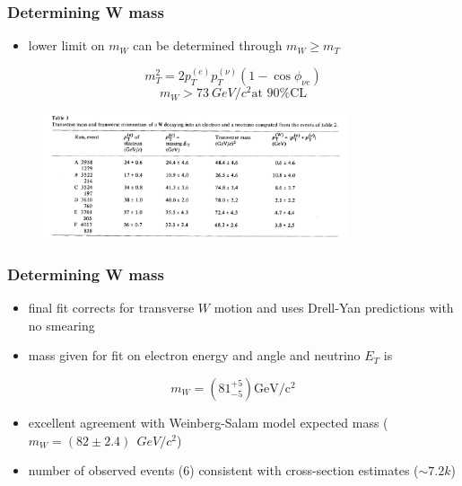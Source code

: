 \documentclass[xcolor=table]{beamer}
\begin{document}

\begin{frame}
\frametitle{Determining W mass}
\fontsize{10pt}{12}\selectfont

\begin{itemize}
\item lower limit on $m_W$ can be determined through $m_W\geq m_T$
\end{itemize}
\begin{equation*}
m_T^2=2p_T^{(e)}p_T^{(\nu)}(1-\cos\phi_{\nu e})
\end{equation*}
\begin{equation*}
m_W > \SI{73}{GeV/c^2} \text{at 90\% CL}
\end{equation*}
\begin{figure}[h]
\centering
\includegraphics[width=0.8\textwidth]{images/transverse-mass.png}
\end{figure}


\end{frame}



\begin{frame}
\frametitle{Determining W mass}
\fontsize{10pt}{12}\selectfont

\begin{itemize}
\item final fit corrects for transverse $W$ motion and uses Drell-Yan predictions with no smearing
\item mass given for fit on electron energy and angle and neutrino $E_T$ is
\end{itemize}

\begin{equation*}
m_W=\left(81^{+5}_{-5}\right)\text{GeV}/\text{c}^2
\end{equation*}

\begin{itemize}
\item excellent agreement with Weinberg-Salam model expected mass ($m_{W}=(82\pm 2.4)~\SI{}{GeV/c^2}$)
\item number of observed events (6) consistent with cross-section estimates ($\sim 7.2 k$)
\end{itemize}

\end{frame}
\end{document}
